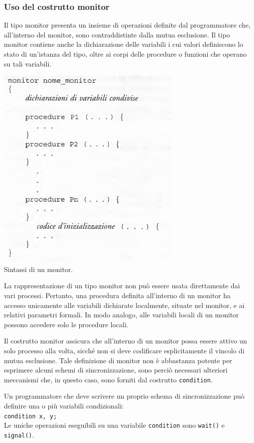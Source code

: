 \documentclass[11pt,a4paper]{article}
\begin{document}
\subsubsection{Uso del costrutto monitor}
Il tipo monitor presenta un insieme di operazioni definite
dal programmatore che, all'interno del monitor, sono contraddistinte dalla mutua esclusio­ne. Il tipo monitor contiene anche la dichiarazione delle variabili i cui valori definiscono lo
stato di un'istanza del tipo, oltre ai corpi delle procedure o funzioni che operano su tali variabili.
\begin{center}
  \includegraphics[scale=0.6]{img/0032.png}\\
  \caption{Sintassi di un monitor.}
\end{center}
La rappresentazione di un ti­po monitor non può essere usata direttamente dai vari processi. Pertanto, una procedura de­finita all'interno di un monitor ha accesso unicamente alle variabili dichiarate localmente,
situate nel monitor, e ai relativi parametri formali. In modo analogo, alle variabili locali di
un monitor possono accedere solo le procedure locali.

Il costrutto monitor assicura che all'interno di un monitor possa essere attivo un solo
processo alla volta, sicché non si deve codificare esplicitamente il vincolo di mutua esclusio­ne. Tale definizione di monitor non è abbastanza potente per esprimere alcu­ni schemi di sincronizzazione, sono perciò necessari ulteriori meccanismi che, in questo ca­so, sono forniti dal costrutto \texttt{condition}.

Un programmatore che deve scrivere un proprio schema di sincronizzazione può definire
una o più variabili condizionali:\medskip\\
\texttt{condition x, y;}\medskip\\
Le uniche operazioni eseguibili su una variabile \texttt{condition} sono \texttt{wait()} e \texttt{signal()}.
\end{document}
